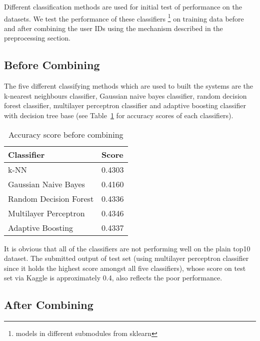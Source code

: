 \documentclass[10pt]{article}
\begin{document}
Different classification methods are used for initial test of performance on the datasets. We test the performance of these classifiers
\footnote{models in different submodules from sklearn}
on training data before and after combining the user IDs using the mechanism described in the preprocessing section.

\subsection{Before Combining}
\justify

The five different classifying methods which are used to built the systems are the k-nearest neighbours classifier, Gaussian naive bayes classifier, random decision forest classifier, multilayer perceptron classifier and adaptive boosting classifier with decision tree base (see Table~\ref{table1} for accuracy scores of each classifiers).
\begin{table}[ht]
\begin{center}
\begin{tabular}{|l|l|}
      \hline
      Classifier & Score\\
      \hline\hline
      k-NN & 0.4303\\
      Gaussian Naive Bayes & 0.4160\\
      Random Decision Forest & 0.4336\\
      Multilayer Perceptron  & 0.4346\\
      Adaptive Boosting & 0.4337\\
      \hline
\end{tabular}
\caption{Accuracy score before combining}\label{table1}
\end{center}
\end{table}
It is obvious that all of the classifiers are not performing well on the plain top10 dataset. The submitted output of test set (using multilayer perceptron classifier since it holds the highest score amongst all five classifiers), whose score on test set via Kaggle is approximately 0.4, also reflects the poor performance.

\subsection{After Combining}
\justify
\end{document}
